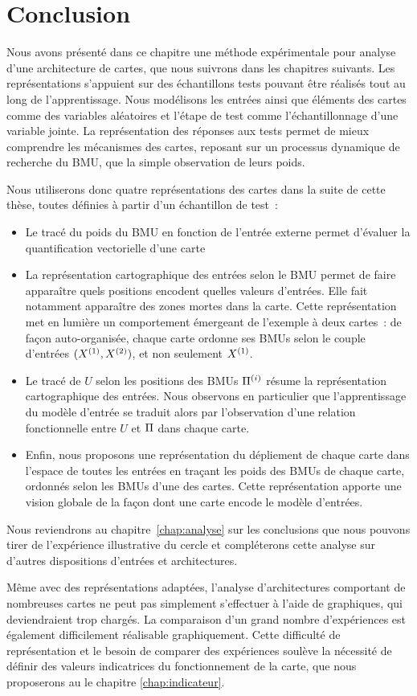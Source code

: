 \documentclass[../main]{subfiles}
\begin{document}
\section{Conclusion}

Nous avons présenté dans ce chapitre une méthode expérimentale pour analyse d'une architecture de cartes, que nous suivrons dans les chapitres suivants.
Les représentations s'appuient sur des échantillons tests pouvant être réalisés tout au long de l'apprentissage.
Nous modélisons les entrées ainsi que éléments des cartes comme des variables aléatoires et l'étape de test comme l'échantillonnage d'une variable jointe. 
La représentation des réponses aux tests permet de mieux comprendre les mécanismes des cartes, reposant sur un processus dynamique de recherche du BMU, que la simple observation de leurs poids.

Nous utiliserons donc quatre représentations des cartes dans la suite de cette thèse, toutes définies à partir d'un échantillon de test~:
\begin{itemize}
    \item Le tracé du poids du BMU en fonction de l'entrée externe permet d'évaluer la quantification vectorielle d'une carte
    \item La représentation cartographique des entrées selon le BMU permet de faire apparaître quels positions encodent quelles valeurs d'entrées. Elle fait notamment apparaître des zones mortes dans la carte. Cette représentation met en lumière un comportement émergeant de l'exemple à deux cartes~: de façon auto-organisée, chaque carte ordonne ses BMUs selon le couple d'entrées $(X^{({1})},X^{({2})})$, et non seulement $X^{({1})}$.
    \item Le tracé de $U$ selon les positions des BMUs $\Pi^{({i})}$ résume la représentation cartographique des entrées. Nous observons en particulier que l'apprentissage du modèle d'entrée se traduit alors par l'observation d'une relation fonctionnelle entre $U$ et $\Pi$ dans chaque carte.
    \item Enfin, nous proposons une représentation du dépliement de chaque carte dans l'espace de toutes les entrées en traçant les poids des BMUs de chaque carte, ordonnés selon les BMUs d'une des cartes. Cette représentation apporte une vision globale de la façon dont une carte encode le modèle d'entrées.
\end{itemize}

Nous reviendrons au chapitre~\ref{chap:analyse} sur les conclusions que nous pouvons tirer de l'expérience illustrative du cercle et compléterons cette analyse sur d'autres dispositions d'entrées et architectures.

Même avec des représentations adaptées, l'analyse d'architectures comportant de nombreuses cartes ne peut pas simplement s'effectuer à l'aide de graphiques, qui deviendraient trop chargés. La comparaison d'un grand nombre d'expériences est également difficilement réalisable graphiquement.
Cette difficulté de représentation et le besoin de comparer des expériences soulève la nécessité de définir des valeurs indicatrices du fonctionnement de la carte, que nous proposerons au le chapitre \ref{chap:indicateur}.
 
\ifSubfilesClassLoaded{
    \printbibliography
}{}
\end{document}
